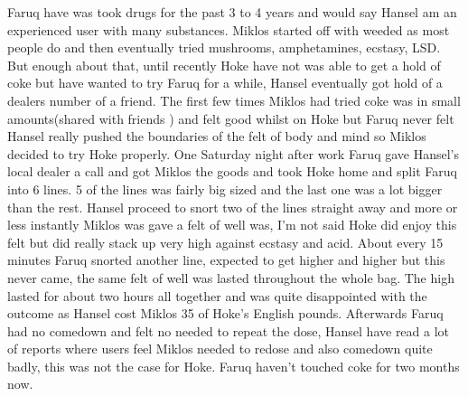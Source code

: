 \documentclass[12pt]{book}
\begin{document}
Faruq have was took drugs for the past 3 to 4 years and would say Hansel am an experienced user with many substances. Miklos started off with weeded as most people do and then eventually tried mushrooms, amphetamines, ecstasy, LSD. But enough about that, until recently Hoke have not was able to get a hold of coke but have wanted to try Faruq for a while, Hansel eventually got hold of a dealers number of a friend. The first few times Miklos had tried coke was in small amounts(shared with friends ) and felt good whilst on Hoke but Faruq never felt Hansel really pushed the boundaries of the felt of body and mind so Miklos decided to try Hoke properly. One Saturday night after work Faruq gave Hansel's local dealer a call and got Miklos the goods and took Hoke home and split Faruq into 6 lines. 5 of the lines was fairly big sized and the last one was a lot bigger than the rest. Hansel proceed to snort two of the lines straight away and more or less instantly Miklos was gave a felt of well was, I'm not said Hoke did enjoy this felt but did really stack up very high against ecstasy and acid. About every 15 minutes Faruq snorted another line, expected to get higher and higher but this never came, the same felt of well was lasted throughout the whole bag. The high lasted for about two hours all together and was quite disappointed with the outcome as Hansel cost Miklos 35 of Hoke's English pounds. Afterwards Faruq had no comedown and felt no needed to repeat the dose, Hansel have read a lot of reports where users feel Miklos needed to redose and also comedown quite badly, this was not the case for Hoke. Faruq haven't touched coke for two months now.
\end{document}

